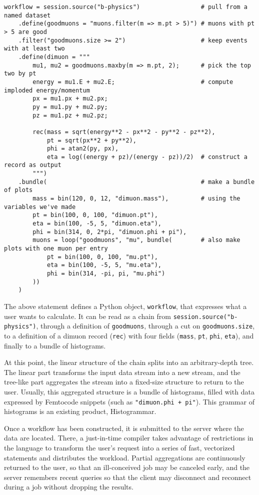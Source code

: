 \documentclass{article}
\begin{document}
\begin{verbatim}
workflow = session.source("b-physics")                 # pull from a named dataset
    .define(goodmuons = "muons.filter(m => m.pt > 5)") # muons with pt > 5 are good
    .filter("goodmuons.size >= 2")                     # keep events with at least two
    .define(dimuon = """
        mu1, mu2 = goodmuons.maxby(m => m.pt, 2);      # pick the top two by pt
        energy = mu1.E + mu2.E;                        # compute imploded energy/momentum
        px = mu1.px + mu2.px;
        py = mu1.py + mu2.py;
        pz = mu1.pz + mu2.pz;

        rec(mass = sqrt(energy**2 - px**2 - py**2 - pz**2),
            pt = sqrt(px**2 + py**2),
            phi = atan2(py, px),
            eta = log((energy + pz)/(energy - pz))/2)  # construct a record as output
        """)
    .bundle(                                           # make a bundle of plots
        mass = bin(120, 0, 12, "dimuon.mass"),         # using the variables we've made
        pt = bin(100, 0, 100, "dimuon.pt"),
        eta = bin(100, -5, 5, "dimuon.eta"),
        phi = bin(314, 0, 2*pi, "dimuon.phi + pi"),
        muons = loop("goodmuons", "mu", bundle(        # also make plots with one muon per entry
            pt = bin(100, 0, 100, "mu.pt"),
            eta = bin(100, -5, 5, "mu.eta"),
            phi = bin(314, -pi, pi, "mu.phi")
        ))
    )
\end{verbatim}

The above statement defines a Python object, {\tt workflow}, that expresses what a user wants to calculate. It can be read as a chain from {\tt session.source("b-physics")}, through a definition of {\tt goodmuons}, through a cut on {\tt goodmuons.size}, to a definition of a dimuon record ({\tt rec}) with four fields ({\tt mass}, {\tt pt}, {\tt phi}, {\tt eta}), and finally to a bundle of histograms.

At this point, the linear structure of the chain splits into an arbitrary-depth tree. The linear part transforms the input data stream into a new stream, and the tree-like part aggregates the stream into a fixed-size structure to return to the user. Usually, this aggregated structure is a bundle of histograms, filled with data expressed by Femtocode snippets (such as {\tt "dimuon.phi + pi"}). This grammar of histograms is an existing product, Histogrammar\footnotemark.


Once a workflow has been constructed, it is submitted to the server where the data are located. There, a just-in-time compiler takes advantage of restrictions in the language to transform the user's request into a series of fast, vectorized statements and distributes the workload. Partial aggregations are continuously returned to the user, so that an ill-conceived job may be canceled early, and the server remembers recent queries so that the client may disconnect and reconnect during a job without dropping the results.
\end{document}
